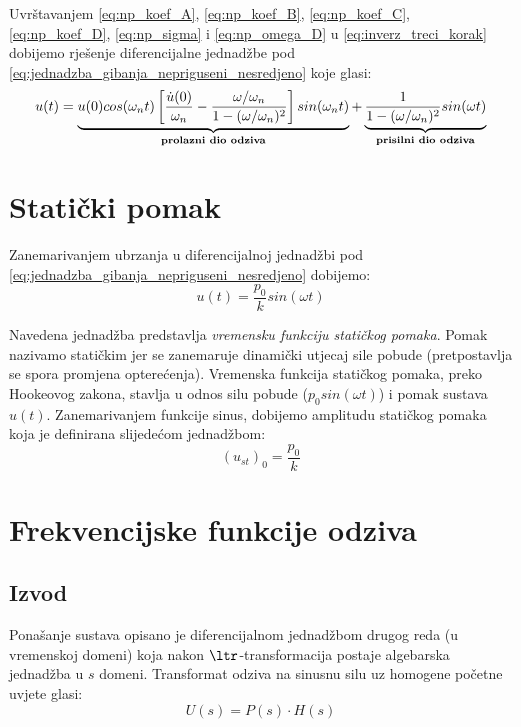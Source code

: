 Uvrštavanjem \eqref{eq:np_koef_A}, \eqref{eq:np_koef_B}, \eqref{eq:np_koef_C},
\eqref{eq:np_koef_D}, \eqref{eq:np_sigma} i \eqref{eq:np_omega_D} u  \eqref{eq:inverz_treci_korak}
dobijemo rješenje diferencijalne jednadžbe pod
\eqref{eq:jednadzba_gibanja_nepriguseni_nesredjeno} 
koje glasi:
\begin{equation}
	u(t)=\underbrace{
            u(0)cos(\omega_n t)
	\left[
		\frac{\dot{u}(0)}{\omega_n}-\frac{\omega/\omega_n}{1-(\omega/\omega_n)^2}
        \right]sin(\omega_n t)\\
	}_{\text{\textbf{prolazni dio odziva}}}
        +
	\underbrace{
		\frac{1}{1-(\omega/\omega_n)^2} sin(\omega t)
	}_{\text{\textbf{prisilni dio odziva}}}
\end{equation}



\section{Statički pomak}
Zanemarivanjem ubrzanja u diferencijalnoj jednadžbi pod
\eqref{eq:jednadzba_gibanja_nepriguseni_nesredjeno} dobijemo:
\begin{equation}\label{eq:vremenska_funkcija_statickog_pomaka}
	u(t)=\frac{p_0}{k}sin(\omega t)
\end{equation}

Navedena jednadžba predstavlja \textit{vremensku funkciju statičkog pomaka}. Pomak
nazivamo statičkim jer se zanemaruje dinamički utjecaj sile pobude (pretpostavlja se
spora promjena opterećenja).
Vremenska funkcija statičkog pomaka, preko Hookeovog zakona, stavlja u odnos silu 
pobude ($p_0sin(\omega t)$) i pomak sustava $u(t)$. Zanemarivanjem funkcije sinus, dobijemo
amplitudu statičkog pomaka koja je definirana slijedećom jednadžbom:
\begin{equation}
	(u_{st})_0 = \frac{p_0}{k}
\end{equation}

\section{Frekvencijske funkcije odziva}
\subsection{Izvod}
Ponašanje sustava opisano je diferencijalnom jednadžbom drugog reda (u vremenskoj
domeni) koja nakon $\ltr$-transformacija postaje algebarska jednadžba u $s$ domeni.
Transformat odziva na sinusnu silu uz homogene početne uvjete glasi:
\begin{equation}
    U(s) = P(s)\cdot H(s) 
\end{equation}

